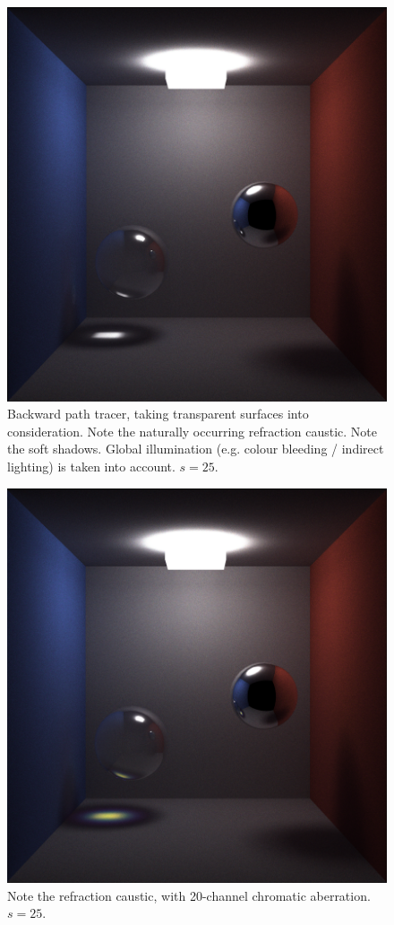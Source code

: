 \documentclass[12pt]{article}
\begin{document}
\begin{figure} 
\centering
  \includegraphics[width = 6 in]{fig5.png}
  \caption{  Backward path tracer, taking transparent surfaces into consideration. 
Note the naturally occurring refraction caustic.
Note the soft shadows.
Global illumination (e.g. colour bleeding / indirect lighting) is taken into account.
$s = 25$.
}
\end{figure}


\begin{figure} 
\centering
  \includegraphics[width = 6 in]{fig6.png}
  \caption{ Note the refraction caustic, with 20-channel chromatic aberration.
$s = 25$.
}
\end{figure}
\end{document}
